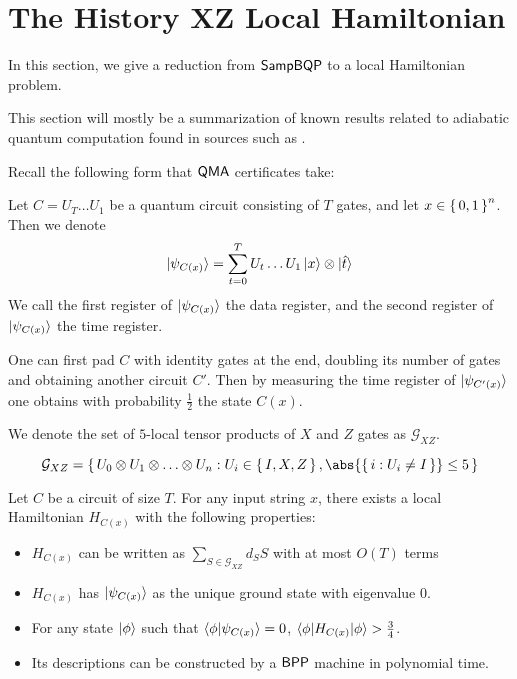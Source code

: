 \section{The History XZ Local Hamiltonian}
\label{sec:Hamiltonian}

In this section, we give a reduction from $\operatorname{\mathsf{SampBQP}}$ to a local Hamiltonian problem.


This section will mostly be a summarization of known results related to adiabatic quantum computation found in sources such as \cite{adiabatic}. 


Recall the following form that $\operatorname{\mathsf{QMA}}$ certificates take:

\begin{dfn}
	\label{dfn:groundstate}	
	Let $C=U_T\ldots U_1$ be a quantum circuit consisting of $T$ gates, and let $x\in\set{0,1}^n$. Then we denote
	$$\ket{\psi_{C(x)}}=\sum_{t=0}^TU_t\ldots U_1\ket{x}\otimes\ket{\hat{t}}$$
	We call the first register of $\ket{\psi_{C(x)}}$ the data register, and the second register of $\ket{\psi_{C(x)}}$ the time register.
\end{dfn}

\begin{rmk}
	\label{idpadding}
	One can first pad $C$ with identity gates at the end, doubling its number of gates and obtaining another circuit $C'$.
	Then by measuring the time register of $\ket{\psi_{C'(x)}}$ one obtains with probability $\frac{1}{2}$ the state $C(x)$.
\end{rmk}


We denote the set of $5$-local tensor products of $X$ and $Z$ gates as $\mathcal{G}_{XZ}$. 

\begin{dfn}
	$$\mathcal{G}_{XZ}=\set{U_0\otimes U_1\otimes\ldots\otimes U_n: U_i\in\set{I,X,Z}, \abs{\set{i: U_i\ne I}}\leq 5}$$
\end{dfn}

\begin{thm}
	Let $C$ be a circuit of size $T$. For any input string $x$,  there exists a local Hamiltonian $H_{C(x)}$  with the following properties:
	\begin{itemize}
		\item $H_{C(x)}$ can be written as $\sum_{S\in\mathcal{G}_{XZ}} d_S S$ with at most $O(T)$ terms
		\item $H_{C(x)}$ has $\ket{\psi_{C(x)}}$ as the unique ground state with eigenvalue $0$.
		\item For any state $\ket\phi$ such that $\braket{\phi|\psi_{C(x)}}=0$,  $\braket{\phi|H_{C(x)}|\phi}>\frac{3}{4}$.
		\item Its descriptions can be constructed by a $\operatorname{\mathsf{BPP}}$ machine in polynomial time.
	\end{itemize}
\end{thm}

